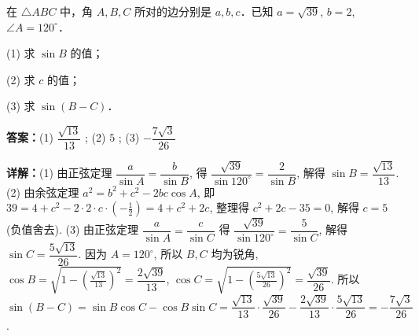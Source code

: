 \begin{question}[points=14]
在 $\triangle ABC$ 中，角 $A, B, C$ 所对的边分别是 $a, b, c$．已知 $a = \sqrt{39}$, $b = 2$, $\angle A = 120^\circ$．

(1) 求 $\sin B$ 的值；

(2) 求 $c$ 的值；

(3) 求 $\sin(B - C)$．
\begin{solution}
\textbf{答案：}(1) $\dfrac{\sqrt{13}}{13}$ ; (2) $5$ ; (3) $-\dfrac{7\sqrt{3}}{26}$

\textbf{详解：}(1) 由正弦定理 $\dfrac{a}{\sin A} = \dfrac{b}{\sin B}$, 得 $\dfrac{\sqrt{39}}{\sin120^\circ} = \dfrac{2}{\sin B}$, 解得 $\sin B = \dfrac{\sqrt{13}}{13}$.
(2) 由余弦定理 $a^2 = b^2 + c^2 - 2bc\cos A$, 即 $39 = 4 + c^2 - 2\cdot 2 \cdot c \cdot \left(-\frac{1}{2}\right) = 4 + c^2 + 2c$, 整理得 $c^2 + 2c - 35 = 0$, 解得 $c = 5$ (负值舍去).
(3) 由正弦定理 $\dfrac{a}{\sin A} = \dfrac{c}{\sin C}$ 得 $\dfrac{\sqrt{39}}{\sin120^\circ} = \dfrac{5}{\sin C}$, 解得 $\sin C = \dfrac{5\sqrt{13}}{26}$. 因为 $A = 120^\circ$, 所以 $B, C$ 均为锐角, $\cos B = \sqrt{1-\left(\frac{\sqrt{13}}{13}\right)^2} = \dfrac{2\sqrt{39}}{13}$, $\cos C = \sqrt{1-\left(\frac{5\sqrt{13}}{26}\right)^2} = \dfrac{\sqrt{39}}{26}$. 所以 $\sin(B-C) = \sin B \cos C - \cos B \sin C = \dfrac{\sqrt{13}}{13} \cdot \dfrac{\sqrt{39}}{26} - \dfrac{2\sqrt{39}}{13} \cdot \dfrac{5\sqrt{13}}{26} = -\dfrac{7\sqrt{3}}{26}$.
\end{solution}
\end{question}

